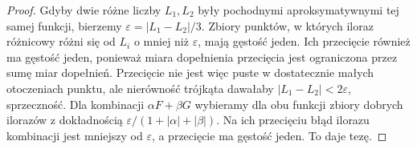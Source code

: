 \begin{proof}
Gdyby dwie różne liczby $L_1,L_2$ były pochodnymi aproksymatywnymi tej samej funkcji, bierzemy $\varepsilon=|L_1-L_2|/3$. Zbiory punktów, w których iloraz różnicowy różni się od $L_i$ o mniej niż $\varepsilon$, mają gęstość jeden. Ich przecięcie również ma gęstość jeden, ponieważ miara dopełnienia przecięcia jest ograniczona przez sumę miar dopełnień. Przecięcie nie jest więc puste w dostatecznie małych otoczeniach punktu, ale nierówność trójkąta dawałaby $|L_1-L_2|<2\varepsilon$, sprzeczność.
Dla kombinacji $\alpha F+\beta G$ wybieramy dla obu funkcji zbiory dobrych ilorazów z dokładnością $\varepsilon/(1+|\alpha|+|\beta|)$. Na ich przecięciu błąd ilorazu kombinacji jest mniejszy od $\varepsilon$, a przecięcie ma gęstość jeden. To daje tezę.
\end{proof}

